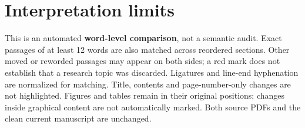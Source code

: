 \documentclass[11pt,letterpaper]{article}
\begin{document}
\section*{Interpretation limits}
This is an automated \textbf{word-level comparison}, not a semantic audit.
Exact passages of at least 12 words are also matched across reordered sections.
Other moved or reworded passages may appear on both sides; a red mark does not
establish that a research topic was discarded. Ligatures and line-end
hyphenation are normalized for matching. Title, contents and page-number-only
changes are not highlighted. Figures and tables remain in their original
positions; changes inside graphical content are not automatically marked.
Both source PDFs and the clean current manuscript are unchanged.
\end{document}
